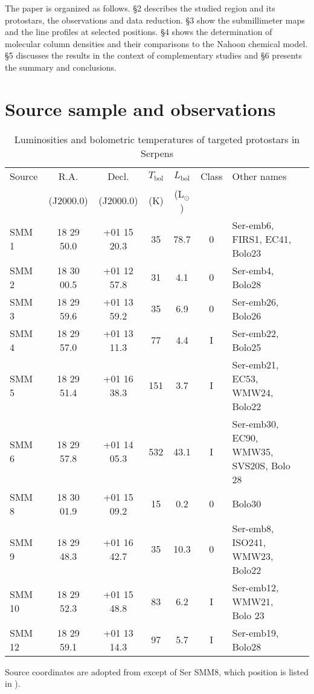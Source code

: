 \documentclass{aa}
\begin{document}
The paper is organized as follows. \S 2 describes the studied region and its protostars, the observations and
data reduction. \S 3 show the submillimeter maps and the line profiles at selected positions.
\S 4 shows the determination of molecular column densities and their comparisons to the 
Nahoon chemical model. \S 5 discusses the results in the context of complementary studies and  
\S 6 presents the summary and conclusions. 

\section{Source sample and observations}
\begin{table*} 
\caption{Luminosities and bolometric temperatures of targeted protostars in Serpens}             %
\label{table:2}      %
\centering                          %
\begin{tabular}{l c c c c c l l} \hline\hline 
Source & R.A. & Decl. & $T_\mathrm{bol}$ &  $L_\mathrm{bol}$  & Class & Other names\\ 
& (J2000.0) & (J2000.0) & (K) & (L$_\odot$) & &\\ 
\hline
SMM 1 & 18 29 50.0 & +01 15 20.3 & 35 & 78.7 & 0 &  Ser-emb6, FIRS1, EC41, Bolo23\\
SMM 2 & 18 30 00.5 & +01 12 57.8 & 31 & 4.1 & 0 & Ser-emb4, Bolo28\\
SMM 3 & 18 29 59.6 & +01 13 59.2 & 35 & 6.9 & 0 &  Ser-emb26, Bolo26\\
SMM 4 & 18 29 57.0 & +01 13 11.3 & 77 & 4.4 & I &  Ser-emb22, Bolo25\\
SMM 5 & 18 29 51.4 & +01 16 38.3 & 151 & 3.7 & I & Ser-emb21, EC53, WMW24, Bolo22 \\
SMM 6 & 18 29 57.8 & +01 14 05.3 & 532 & 43.1 & I & Ser-emb30, EC90, WMW35, SVS20S, Bolo
28 \\
SMM 8 & 18 30 01.9 & +01 15 09.2 & 15 & 0.2 & 0 & Bolo30\\ 
SMM 9 & 18 29 48.3 & +01 16 42.7 &  35 & 10.3 & 0 &  Ser-emb8, ISO241, WMW23, Bolo22\\
SMM 10 & 18 29 52.3 & +01 15 48.8 & 83 & 6.2 & I & Ser-emb12, WMW21, Bolo 23\\
SMM 12 & 18 29 59.1 & +01 13 14.3 & 97 & 5.7 &  I &  Ser-emb19, Bolo28\\
\hline 
\end{tabular}
\begin{flushleft} Source coordinates are adopted from \citealt{Sur16} except of Ser SMM8,
which position is listed in \citealt{Lee14}).\\
\end{flushleft} 
\end{table*}
\end{document}
